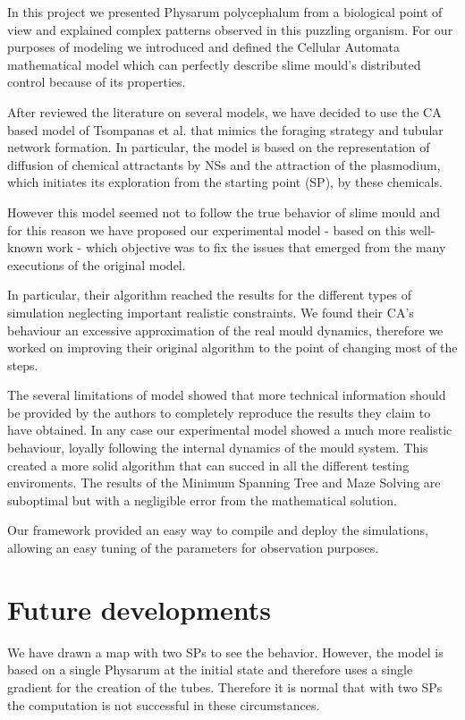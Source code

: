 In this project we presented Physarum polycephalum from a biological point of view and explained complex patterns observed in this puzzling organism. For our purposes of modeling we introduced and defined the Cellular Automata mathematical model  which can perfectly describe slime mould's distributed control because of its properties.

\par
After reviewed the literature on several models, we have decided to use the CA based model of Tsompanas et al. \cite{Tsompanas2016} that mimics the foraging strategy and tubular network formation. In particular, the model is based on the representation of diffusion of chemical attractants by NSs and the attraction of the plasmodium, which initiates its exploration from the starting point (SP), by these chemicals. 

\par
However this model seemed not to follow the true behavior of slime mould and for this reason we have proposed our experimental model - based on this well-known work - which objective was to fix the issues that emerged from the many executions of the original model.

\par
In particular, their algorithm reached the results for the different types of simulation neglecting important realistic constraints. We found their CA's behaviour an excessive approximation of the real mould dynamics, therefore we worked on improving their original algorithm to the point of changing most of the steps.

\par
The several limitations of \cite{Tsompanas2016} model showed that more technical information should be provided by the authors to completely reproduce the results they claim to have obtained.
In any case our experimental model showed a much more realistic behaviour, loyally following the internal dynamics of the mould system. This created a more solid algorithm that can succed in all the different testing enviroments. The results of the Minimum Spanning Tree and Maze Solving are suboptimal but with a negligible error from the mathematical solution.

\par
Our framework provided an easy way to compile and deploy the simulations, allowing an easy tuning of the parameters for observation purposes.

\section{Future developments}
We have drawn a map with two SPs to see the behavior. However, the model is based on a single Physarum at the initial state and therefore uses a single gradient for the creation of the tubes. Therefore it is normal that with two SPs the computation is not successful in these circumstances.

